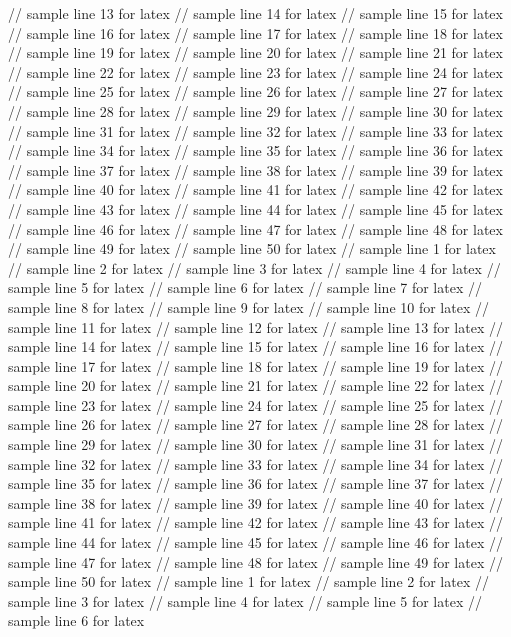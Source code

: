 // sample line 13 for latex
// sample line 14 for latex
// sample line 15 for latex
// sample line 16 for latex
// sample line 17 for latex
// sample line 18 for latex
// sample line 19 for latex
// sample line 20 for latex
// sample line 21 for latex
// sample line 22 for latex
// sample line 23 for latex
// sample line 24 for latex
// sample line 25 for latex
// sample line 26 for latex
// sample line 27 for latex
// sample line 28 for latex
// sample line 29 for latex
// sample line 30 for latex
// sample line 31 for latex
// sample line 32 for latex
// sample line 33 for latex
// sample line 34 for latex
// sample line 35 for latex
// sample line 36 for latex
// sample line 37 for latex
// sample line 38 for latex
// sample line 39 for latex
// sample line 40 for latex
// sample line 41 for latex
// sample line 42 for latex
// sample line 43 for latex
// sample line 44 for latex
// sample line 45 for latex
// sample line 46 for latex
// sample line 47 for latex
// sample line 48 for latex
// sample line 49 for latex
// sample line 50 for latex
// sample line 1 for latex
// sample line 2 for latex
// sample line 3 for latex
// sample line 4 for latex
// sample line 5 for latex
// sample line 6 for latex
// sample line 7 for latex
// sample line 8 for latex
// sample line 9 for latex
// sample line 10 for latex
// sample line 11 for latex
// sample line 12 for latex
// sample line 13 for latex
// sample line 14 for latex
// sample line 15 for latex
// sample line 16 for latex
// sample line 17 for latex
// sample line 18 for latex
// sample line 19 for latex
// sample line 20 for latex
// sample line 21 for latex
// sample line 22 for latex
// sample line 23 for latex
// sample line 24 for latex
// sample line 25 for latex
// sample line 26 for latex
// sample line 27 for latex
// sample line 28 for latex
// sample line 29 for latex
// sample line 30 for latex
// sample line 31 for latex
// sample line 32 for latex
// sample line 33 for latex
// sample line 34 for latex
// sample line 35 for latex
// sample line 36 for latex
// sample line 37 for latex
// sample line 38 for latex
// sample line 39 for latex
// sample line 40 for latex
// sample line 41 for latex
// sample line 42 for latex
// sample line 43 for latex
// sample line 44 for latex
// sample line 45 for latex
// sample line 46 for latex
// sample line 47 for latex
// sample line 48 for latex
// sample line 49 for latex
// sample line 50 for latex
// sample line 1 for latex
// sample line 2 for latex
// sample line 3 for latex
// sample line 4 for latex
// sample line 5 for latex
// sample line 6 for latex
